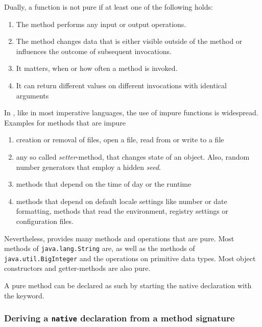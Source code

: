 
Dually, a function is not pure if at least one of the following holds:
\begin{enumerate}
\item The method performs any input or output operations.
\item The method changes data that is either visible outside of the method or influences the outcome of subsequent invocations. 
\item It matters, when or how often a method is invoked.
\item It can return different values on different invocations with identical arguments
\end{enumerate}

In \java{}, like in most imperative languages, the use of impure functions is widespread.
Examples for methods that are impure
\begin{enumerate}
\item creation or removal of files, open a file, read from or write to a file
\item any so called \emph{setter}-method, that changes state of an object. Also, random number generators that employ a hidden \emph {seed}.
\item methods that depend on the time of day or the runtime
\item methods that depend on default locale settings like number or date formatting, methods that read the environment, registry settings or configuration files.
\end{enumerate}

Nevertheless, \java{} provides many methods and operations that are pure. Most methods of {\tt java.lang.String} are, as well as the methods of {\tt java.util.BigInteger} and the operations on primitive data types. Most object constructors and getter-methods are also pure.

A pure \java{} method can be declared as such by starting the native declaration with the  keyword.


\subsubsection{Deriving a \frege{} \texttt{native} declaration from a \java{} method signature}


